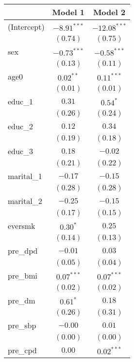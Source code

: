 
\begin{tabular}{l c c}
\toprule
 & Model 1 & Model 2 \\
\midrule
(Intercept)      & $-8.91^{***}$ & $-12.08^{***}$ \\
                 & $(0.74)$      & $(0.75)$       \\
sex              & $-0.73^{***}$ & $-0.58^{***}$  \\
                 & $(0.13)$      & $(0.11)$       \\
age0             & $0.02^{**}$   & $0.11^{***}$   \\
                 & $(0.01)$      & $(0.01)$       \\
educ\_1          & $0.31$        & $0.54^{*}$     \\
                 & $(0.26)$      & $(0.24)$       \\
educ\_2          & $0.12$        & $0.34$         \\
                 & $(0.19)$      & $(0.18)$       \\
educ\_3          & $0.18$        & $-0.02$        \\
                 & $(0.21)$      & $(0.22)$       \\
marital\_1       & $-0.17$       & $-0.15$        \\
                 & $(0.28)$      & $(0.28)$       \\
marital\_2       & $-0.25$       & $-0.15$        \\
                 & $(0.17)$      & $(0.15)$       \\
eversmk          & $0.30^{*}$    & $0.25$         \\
                 & $(0.14)$      & $(0.13)$       \\
pre\_dpd         & $-0.01$       & $0.03$         \\
                 & $(0.05)$      & $(0.04)$       \\
pre\_bmi         & $0.07^{***}$  & $0.07^{***}$   \\
                 & $(0.02)$      & $(0.02)$       \\
pre\_dm          & $0.61^{*}$    & $0.18$         \\
                 & $(0.26)$      & $(0.31)$       \\
pre\_sbp         & $-0.00$       & $0.01$         \\
                 & $(0.00)$      & $(0.00)$       \\
pre\_cpd         & $0.00$        & $0.02^{***}$   \\

\end{tabular}
